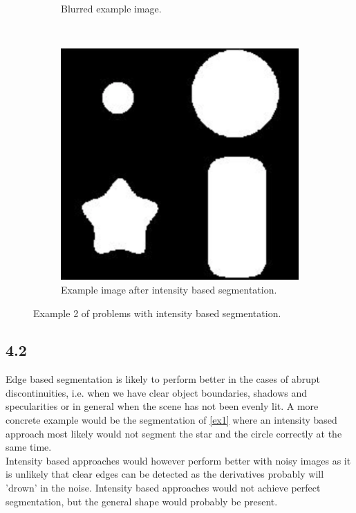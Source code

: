 \begin{figure}[H]
\begin{subfigure}[b]{0.35\linewidth}
		\caption{Blurred example image.}
	\end{subfigure}
	\\
	\begin{subfigure}[b]{0.35\linewidth}
		\centering
		\includegraphics[width=\linewidth]{Materials/E4/ex2soft}
		\caption{Example image after intensity based segmentation.}
	\end{subfigure}
	\caption{Example 2 of problems with intensity based segmentation.}
	\label{ex2}
\end{figure}

\subsection*{4.2}
Edge based segmentation is likely to perform better in the cases of abrupt discontinuities, i.e. when we have clear object boundaries, shadows and specularities or in general when the scene has not been evenly lit. A more concrete example would be the segmentation of \autoref{ex1} where an intensity based approach most likely would not segment the star and the circle correctly at the same time.\\
Intensity based approaches would however perform better with noisy images as it is unlikely that clear edges can be detected as the derivatives probably will 'drown' in the noise. Intensity based approaches would not achieve perfect segmentation, but the general shape would probably be present. 

